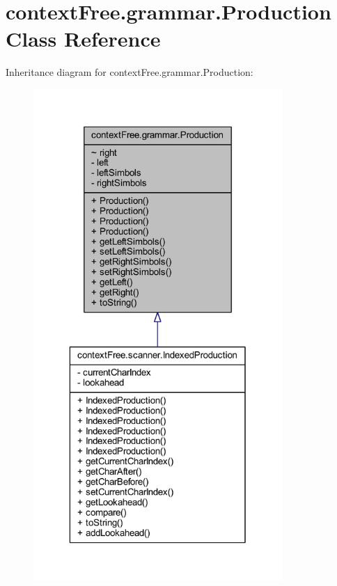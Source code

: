 \hypertarget{classcontext_free_1_1grammar_1_1_production}{\section{context\-Free.\-grammar.\-Production Class Reference}
\label{classcontext_free_1_1grammar_1_1_production}
}


Inheritance diagram for context\-Free.\-grammar.\-Production\-:\nopagebreak
\begin{figure}[H]
\begin{center}
\leavevmode
\includegraphics[width=268pt]{classcontext_free_1_1grammar_1_1_production__inherit__graph}
\end{center}
\end{figure}


